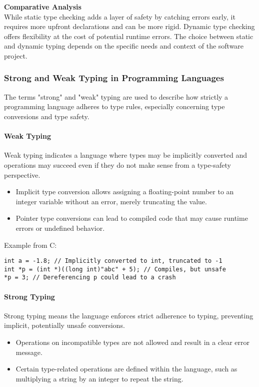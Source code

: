 \documentclass[12pt]{article}
\begin{document}
\textbf{Comparative Analysis}\\
While static type checking adds a layer of safety by catching errors early, it requires more upfront declarations and can be more rigid. Dynamic type checking offers flexibility at the cost of potential runtime errors. The choice between static and dynamic typing depends on the specific needs and context of the software project.


\subsubsection{Strong and Weak Typing in Programming Languages}

The terms "strong" and "weak" typing are used to describe how strictly a programming language adheres to type rules, especially concerning type conversions and type safety.

\paragraph{Weak Typing}

Weak typing indicates a language where types may be implicitly converted and operations may succeed even if they do not make sense from a type-safety perspective.

\begin{itemize}
    \item Implicit type conversion allows assigning a floating-point number to an integer variable without an error, merely truncating the value.
    \item Pointer type conversions can lead to compiled code that may cause runtime errors or undefined behavior.
\end{itemize}
Example from C:
\begin{lstlisting}
int a = -1.8; // Implicitly converted to int, truncated to -1
int *p = (int *)((long int)"abc" + 5); // Compiles, but unsafe
*p = 3; // Dereferencing p could lead to a crash
\end{lstlisting}

\paragraph{Strong Typing}

Strong typing means the language enforces strict adherence to typing, preventing implicit, potentially unsafe conversions.

\begin{itemize}
    \item Operations on incompatible types are not allowed and result in a clear error message.
    \item Certain type-related operations are defined within the language, such as multiplying a string by an integer to repeat the string.
\end{itemize}
\end{document}
